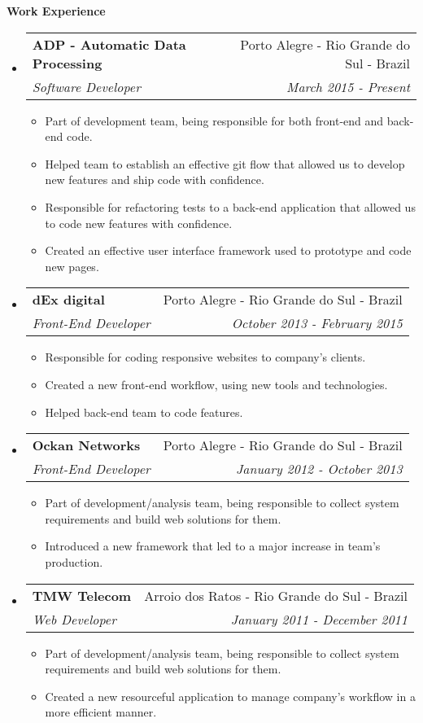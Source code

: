 \documentclass[letterpaper,11pt]{article}
\makeatletter
\newcommand{\resitem}[1]{\item #1 \vspace{-2pt}}
\newcommand{\resheading}[1]{{\large \colorbox{mygrey}{\begin{minipage}{\textwidth}{\textbf{#1 \vphantom{p\^{E}}}}\end{minipage}}}}
\newcommand{\ressubheading}[4]{
\begin{tabular*}{7.0in}{l@{\extracolsep{\fill}}r}
    \textbf{#1} & #2 \\
    \textit{#3} & \textit{#4} \\
\end{tabular*}\vspace{-6pt}}
\makeatother
\begin{document}
    \resheading{Work Experience}
    \begin{itemize}
        \item
            \ressubheading
                {ADP - Automatic Data Processing}
                {Porto Alegre - Rio Grande do Sul - Brazil}
                {Software Developer}
                {March 2015 - Present}
            \begin{itemize}
                \resitem{Part of development team, being responsible for both front-end and back-end code.}
                \resitem{Helped team to establish an effective git flow that allowed us to develop new features and ship code with confidence.}
                \resitem{Responsible for refactoring tests to a back-end application that allowed us to code new features with confidence.}
                \resitem{Created an effective user interface framework used to prototype and code new pages.}
            \end{itemize}

        \item
            \ressubheading
                {dEx digital}
                {Porto Alegre - Rio Grande do Sul - Brazil}
                {Front-End Developer}
                {October 2013 - February 2015}
            \begin{itemize}
                \resitem{Responsible for coding responsive websites to company's clients.}
                \resitem{Created a new front-end workflow, using new tools and technologies.}
                \resitem{Helped back-end team to code features.}
            \end{itemize}

        \item
            \ressubheading
                {Ockan Networks}
                {Porto Alegre - Rio Grande do Sul - Brazil}
                {Front-End Developer}
                {January 2012 - October 2013}
            \begin{itemize}
                \resitem{Part of development/analysis team, being responsible to collect system requirements and build web solutions for them.}
                \resitem{Introduced a new framework that led to a major increase in team's production.}
            \end{itemize}

        \item
            \ressubheading
                {TMW Telecom}
                {Arroio dos Ratos - Rio Grande do Sul - Brazil}
                {Web Developer}
                {January 2011 - December 2011}
            \begin{itemize}
                \resitem{Part of development/analysis team, being responsible to collect system requirements and build web solutions for them.}
                \resitem{Created a new resourceful application to manage company's workflow in a more efficient manner.}
            \end{itemize}
    \end{itemize}
\end{document}
